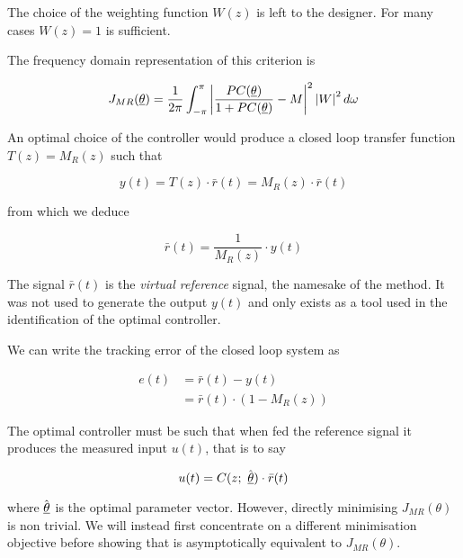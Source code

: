 The choice of the weighting function \( W(z) \) is left to the designer. For many cases \( W(z) = 1 \) is sufficient. 

The frequency domain representation of this criterion is

\begin{equation}
    J_{MR}(\underline{\theta}) =  \frac{1}{2\pi} \int_{-\pi}^{\pi} \left| \frac{PC(\underline{\theta})}{1 + PC(\underline{\theta})} - M \right|^2 \left| W \right|^2 d\omega
    \label{eq:jmr_freq}
\end{equation}

An optimal choice of the controller would produce a closed loop transfer function \( T(z) = M_R(z) \) such that

\begin{equation}
    y(t) = T(z) \cdot \bar{r}(t) = M_R(z) \cdot \bar{r}(t)
    \label{eq:ref_equals_compl_sens}
\end{equation}

from which we deduce

\begin{equation}
    \bar{r}(t) = \frac{1}{M_R(z)} \cdot y(t)
    \label{eq:reference_signal}
\end{equation}

The signal \( \bar{r}(t) \) is the \emph{virtual reference} signal, the namesake of the method. It was not used to generate the output \( y(t) \) and only exists as a tool used in the identification of the optimal controller. 

We can write the tracking error of the closed loop system as

\begin{equation}
    \begin{aligned}
        e(t) &= \bar{r}(t) - y(t) \\ 
             &= \bar{r}(t) \cdot (1 - M_R(z))
    \end{aligned}
    \label{eq:tracking_error}
\end{equation}

The optimal controller must be such that when fed the reference signal it produces the measured input \( u(t) \), that is to say 

\begin{equation}
    u(t) = C(z;\ \hat{\underline{\theta}}) \cdot \bar{r}(t)
\end{equation}

\noindent
where \( \hat{\underline{\theta}} \) is the optimal parameter vector. However, directly minimising \( J_{MR}(\theta) \) is non trivial. We will instead first concentrate on a different minimisation objective before showing that is asymptotically equivalent to \( J_{MR}(\theta) \).

